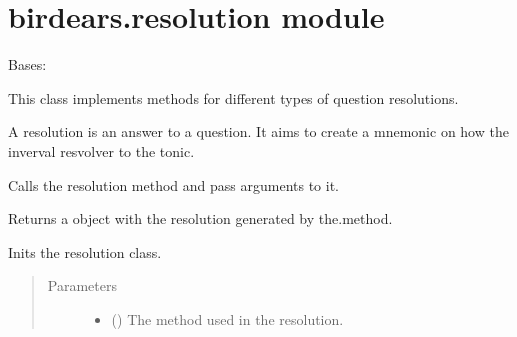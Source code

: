 \documentclass[letterpaper,10pt,english]{sphinxmanual}
\begin{document}
\section{birdears.resolution module}
\label{\detokenize{index:module-birdears.resolution}}\label{\detokenize{index:birdears-resolution-module}}

\begin{fulllineitems}
\label{\detokenize{index:birdears.resolution.Resolution}}
Bases: 

This class implements methods for different types of question
resolutions.

A resolution is an answer to a question. It aims to create a mnemonic on
how the inverval resvolver to the tonic.

\begin{fulllineitems}
\label{\detokenize{index:birdears.resolution.Resolution.__call__}}
Calls the resolution method and pass arguments to it.

Returns a  object with the resolution generated by
the.method.

\end{fulllineitems}


\begin{fulllineitems}
\label{\detokenize{index:birdears.resolution.Resolution.__init__}}
Inits the resolution class.
\begin{quote}\begin{description}
\item[{Parameters}] \leavevmode\begin{itemize}
\item {} 
 () \textendash{} The method used in the resolution.


\end{itemize}
\end{description}
\end{quote}
\end{fulllineitems}
\end{fulllineitems}
\end{document}
